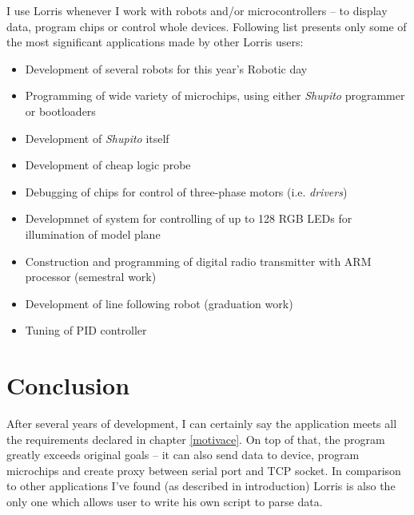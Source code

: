 \documentclass[12pt, a4paper, oneside]{article}
\newcommand{\It}{\textit}  %
\newcommand{\Has}{\textcolor{green}{\CheckmarkBold}}
\begin{document}
I use Lorris whenever I work with robots and/or microcontrollers -- to display data, program chips or control whole devices. Following list presents only some of the most significant applications made by other Lorris users:
\begin{itemize}
    \item Development of several robots for this year's Robotic day
    \item Programming of wide variety of microchips, using either \It{Shupito} programmer or bootloaders
    \item Development of \It{Shupito} itself
    \item Development of cheap logic probe
    \item Debugging of chips for control of three-phase motors (i.e. \It{drivers})
    \item Developmnet of system for controlling of up to 128 RGB LEDs for illumination of model plane
    \item Construction and programming of digital radio transmitter with ARM processor (semestral work)
    \item Development of line following robot (graduation work)
    \item Tuning of PID controller
\end{itemize}

\section*{Conclusion}
After several years of development, I can certainly say the application meets all the requirements declared in chapter \ref{motivace}.
On top of that, the program greatly exceeds original goals -- it can also send data to device, program microchips and create proxy between serial port and TCP socket. In comparison to other applications I've found (as described in introduction) Lorris is also the only one which allows user to write his own script to parse data.
\end{document}
